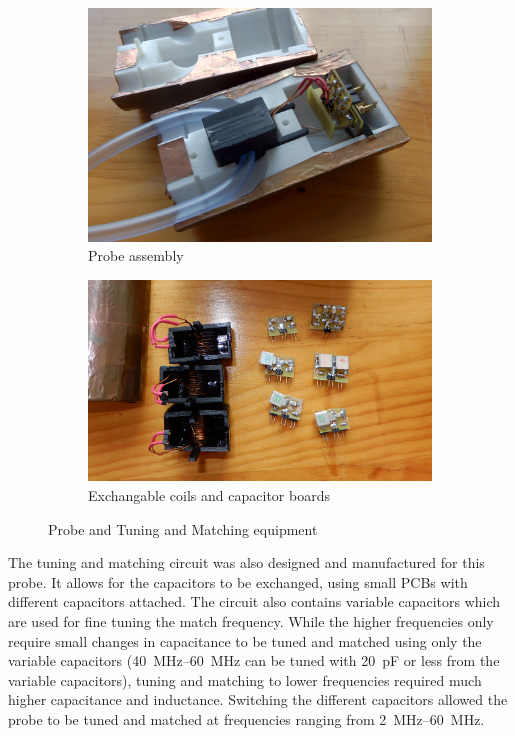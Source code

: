 \begin{figure}[th]
\centering
\begin{subfigure}[t]{0.4\textwidth}
\includegraphics[width=\textwidth]{figures/exptsetup/probe.JPG}
\caption{Probe assembly}
\label{fit:exptsetup-probe}
\end{subfigure}
\hspace{1cm}
\begin{subfigure}[t]{0.4\textwidth}
\includegraphics[width=\textwidth]{figures/exptsetup/circuit.jpg}
\caption{Exchangable coils and capacitor boards}
\label{fig:exptsetup-coils}
\end{subfigure}
\caption{Probe and Tuning and Matching equipment}
\end{figure}

The tuning and matching circuit was also designed and manufactured for this probe.
It allows for the capacitors to be exchanged, using small PCBs with different capacitors attached.
The circuit also contains variable capacitors which are used for fine tuning the match frequency.
While the higher frequencies only require small changes in capacitance to be tuned and matched using only the variable capacitors (\SIrange[range-phrase = --]{40}{60}{MHz} can be tuned with \SI{20}{pF} or less from the variable capacitors), tuning and matching to lower frequencies required much higher capacitance and inductance.
Switching the different capacitors allowed the probe to be tuned and matched at frequencies ranging from \SIrange{2}{60}{\mega\hertz}.

